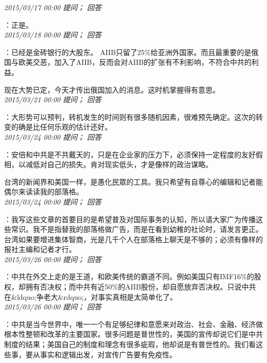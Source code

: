\documentclass[twocolumn]{ctexart}
\begin{document}
\textit{\hfill\noindent\small 2015/03/17 00:00 提问； 回答}

：正是。\\

\textit{\hfill\noindent\small 2015/03/18 00:00 提问； 回答}

：已经是金砖银行的大股东。 AIIB只留了25\%给亚洲外国家。而且最重要的是俄国与欧美交恶，加入了AIIB，反而会对AIIB的扩张有不利影响，不符合中共的利益。

现在大势已定，今天才传出俄国加入的消息。这时机掌握得有意思。\\

\textit{\hfill\noindent\small 2015/03/21 00:00 提问； 回答}

：大形势可以预判，转机发生的时间则有很多随机因素，很难预先确定。这次的转变的确是比任何乐观的估计还好。\\

\textit{\hfill\noindent\small 2015/03/24 00:00 提问； 回答}

：安倍和中共是不共戴天的，只是在企业家的压力下，必须保持一定程度的友好假相，以减低对自己的损失。肯对现实低头，才是像样的政治谋略。

台湾的新闻界和美国一样，是愚化民眾的工具。我只希望有自尊心的编辑和记者能偶尔来读读我的部落格。\\

\textit{\hfill\noindent\small 2015/03/24 00:00 提问； 回答}

：我写这些文章的首要目的是希望普及对国际事务的认知，所以请大家广为传播这些常识。我不是指替我的部落格做广告，而是在看到幼稚的社论时，请发言更正。台湾如果要增进集体智商，光是几千个人在部落格上聊天是不够的；必须有像样的报社主编和记者才行。\\

\textit{\hfill\noindent\small 2015/03/26 00:00 提问； 回答}

：中共在外交上走的是王道，和欧美传统的霸道不同。例如美国只有IMF16\%的股权，却拥有否决权；而中共有近50\%的AIIB股份，却自愿放弃否决权。只说中共在\&ldquo;争老大\&rdquo;，对事实真相是太简单化了。\\

\textit{\hfill\noindent\small 2015/03/26 00:00 提问； 回答}

：中共是当今世界中，唯一一个有足够纪律和意愿来对政治、社会、金融、经济做根本性整顿和改革的主要国家。很多问题是普世性的，美国的宣传却说它们是中共制度的结果；美国自己的制度和理念有很多疵瑕，他却说是有普世性的。我们看这些事，要从事实和逻辑出发，对宣传广告要有免疫性。\\
\end{document}
